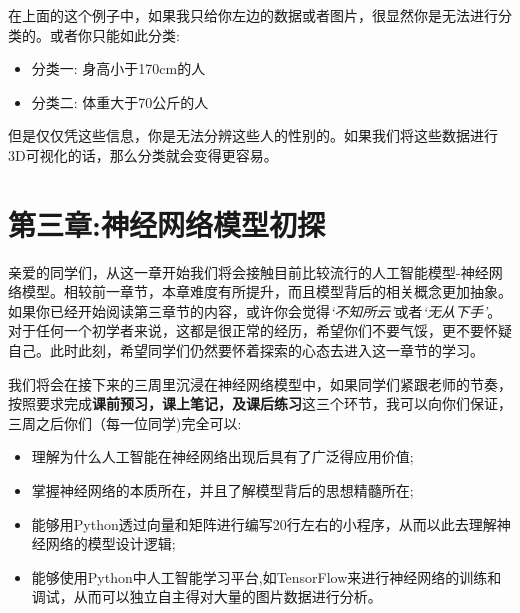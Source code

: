 \documentclass[12pt]{article}
\numberwithin{figure}{section}
\numberwithin{equation}{section}
\begin{document}
在上面的这个例子中，如果我只给你左边的数据或者图片，很显然你是无法进行分类的。或者你只能如此分类:
\begin{itemize}
	\item 分类一: 身高小于170cm的人
	\item 分类二: 体重大于70公斤的人
\end{itemize}
但是仅仅凭这些信息，你是无法分辨这些人的性别的。如果我们将这些数据进行3D可视化的话，那么分类就会变得更容易。




































\newpage
\part*{第三章:神经网络模型初探}


亲爱的同学们，从这一章开始我们将会接触目前比较流行的人工智能模型-神经网络模型。相较前一章节，本章难度有所提升，而且模型背后的相关概念更加抽象。如果你已经开始阅读第三章节的内容，或许你会觉得\textit{`不知所云'}或者\textit{`无从下手'}。 对于任何一个初学者来说，这都是很正常的经历，希望你们不要气馁，更不要怀疑自己。此时此刻，希望同学们仍然要怀着探索的心态去进入这一章节的学习。

我们将会在接下来的三周里沉浸在神经网络模型中，如果同学们紧跟老师的节奏，按照要求完成\textbf{课前预习，课上笔记，及课后练习}这三个环节，我可以向你们保证，三周之后你们（每一位同学)完全可以:
\begin{itemize}
	\item 理解为什么人工智能在神经网络出现后具有了广泛得应用价值;
	\item 掌握神经网络的本质所在，并且了解模型背后的思想精髓所在;
	\item 能够用Python透过向量和矩阵进行编写20行左右的小程序，从而以此去理解神经网络的模型设计逻辑;
	\item 能够使用Python中人工智能学习平台,如TensorFlow来进行神经网络的训练和调试，从而可以独立自主得对大量的图片数据进行分析。
\end{itemize}
\end{document}

